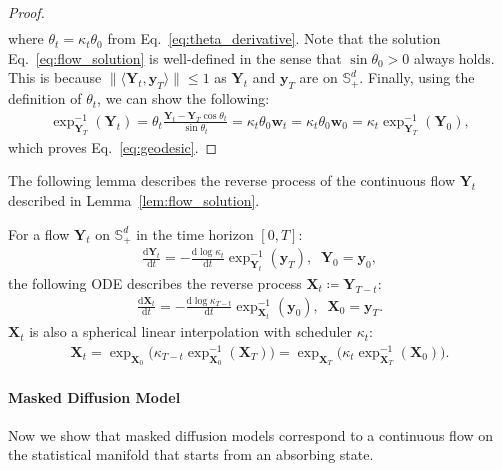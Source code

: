 \begin{proof}
\begin{align}
\end{align}
where $\theta_t=\kappa_t\theta_0$ from Eq.~\eqref{eq:theta_derivative}.
Note that the solution Eq.~\eqref{eq:flow_solution} is well-defined in the sense that $\sin\theta_0>0$ always holds. This is because $\|\langle \bm{Y}_t, \bm{y}_T \rangle\|\leq 1$ as $\bm{Y}_t$ and $\bm{y}_T$ are on $\mathbb{S}^d_+$.
Finally, using the definition of $\theta_t$, we can show the following:
\begin{align}
    \exp^{-1}_{\bm{Y}_T}(\bm{Y}_t) 
    = \theta_t\frac{\bm{Y}_t - \bm{Y}_T\cos\theta_t}{\sin\theta_t} 
    = \kappa_t\theta_0\bm{w}_t = \kappa_t\theta_0\bm{w}_0 
    = \kappa_t\exp^{-1}_{\bm{Y}_T}(\bm{Y}_0) ,
\end{align}
which proves Eq.~\eqref{eq:geodesic}.
\end{proof}

The following lemma describes the reverse process of the continuous flow $\bm{Y}_t$ described in Lemma~\ref{lem:flow_solution}.
\begin{tcolorbox}
[colback=white,colframe=blue!30!white]
\begin{lemma}
For a flow $\bm{Y}_t$ on $\mathbb{S}^d_{+}$ in the time horizon $[0,T]$:
\begin{align}
    \frac{\mathrm{d}\bm{Y}_t}{\mathrm{d}t} = 
    -\frac{\mathrm{d}\log \kappa_t}{\mathrm{d}t}
    \exp^{-1}_{\bm{Y}_t}(\bm{y}_T), \;\; \bm{Y}_0=\bm{y}_0, 
\label{eq:forward_flow}
\end{align}
the following ODE describes the reverse process $\bm{X}_{t}\coloneqq\bm{Y}_{T-t}$:
\begin{align}
    \frac{\mathrm{d}\bm{X}_t}{\mathrm{d}t} = 
    -\frac{\mathrm{d}\log \kappa_{T-t}}{\mathrm{d}t}
    \exp^{-1}_{\bm{X}_t}(\bm{y}_0), \;\; \bm{X}_0=\bm{y}_T.
\label{eq:reverse_flow}
\end{align}
$\bm{X}_t$ is also a spherical linear interpolation with scheduler $\kappa_t$:
\begin{align}
    \bm{X}_t = \exp_{\bm{X}_0}\Big( \kappa_{T-t}\exp^{-1}_{\bm{X}_0}(\bm{X}_T) \Big) = \exp_{\bm{X}_T}\Big( \kappa_{t}\exp^{-1}_{\bm{X}_T}(\bm{X}_0) \Big) .
\end{align}
\end{lemma}
\end{tcolorbox}


\paragraph{Masked Diffusion Model}
Now we show that masked diffusion models correspond to a continuous flow on the statistical manifold that starts from an absorbing state.

